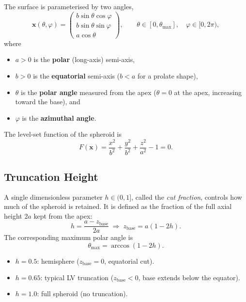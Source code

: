 \documentclass[11pt,a4paper]{article}
\newcommand{\bx}{\mathbf{x}}
\begin{document}
The surface is parameterised by two angles,
\begin{equation}
  \bx(\theta,\varphi)
  =
  \begin{pmatrix}
    b\sin\theta\cos\varphi \\
    b\sin\theta\sin\varphi \\
    a\cos\theta
  \end{pmatrix},
  \qquad
  \theta\in[0,\theta_{\max}],\quad
  \varphi\in[0,2\pi),
  \label{eq:parameterisation}
\end{equation}
where
\begin{itemize}
  \item $a > 0$ is the \textbf{polar} (long-axis) semi-axis,
  \item $b > 0$ is the \textbf{equatorial} semi-axis ($b < a$ for a prolate
        shape),
  \item $\theta$ is the \textbf{polar angle} measured from the apex
        ($\theta=0$ at the apex, increasing toward the base), and
  \item $\varphi$ is the \textbf{azimuthal angle}.
\end{itemize}

The level-set function of the spheroid is
\begin{equation}
  F(\bx) = \frac{x^2}{b^2} + \frac{y^2}{b^2} + \frac{z^2}{a^2} - 1 = 0.
\end{equation}

\subsection{Truncation Height}

A single dimensionless parameter $h \in (0,1]$, called the \emph{cut
fraction}, controls how much of the spheroid is retained.  It is defined as
the fraction of the full axial height $2a$ kept from the apex:
\begin{equation}
  h = \frac{a - z_{\text{base}}}{2a}
  \;\Longrightarrow\;
  z_{\text{base}} = a(1 - 2h).
\end{equation}
The corresponding maximum polar angle is
\begin{equation}
  \boxed{\theta_{\max} = \arccos(1 - 2h).}
  \label{eq:theta_cut}
\end{equation}
\begin{itemize}
  \item $h = 0.5$: hemisphere ($z_{\text{base}} = 0$, equatorial cut).
  \item $h = 0.65$: typical LV truncation ($z_{\text{base}} < 0$, base extends
        below the equator).
  \item $h = 1.0$: full spheroid (no truncation).
\end{itemize}
\end{document}

